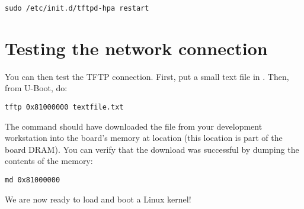 \begin{verbatim}
sudo /etc/init.d/tftpd-hpa restart
\end{verbatim}

\section{Testing the network connection}

You can then test the TFTP connection.  First, put a small text
file in . Then, from U-Boot, do:

\begin{verbatim}
tftp 0x81000000 textfile.txt
\end{verbatim}

The  command should have downloaded the
 file from your development workstation into the
board's memory at location  (this location is part of
the board DRAM). You can verify that the download was successful by
dumping the contents of the memory:

\begin{verbatim}
md 0x81000000
\end{verbatim}

We are now ready to load and boot a Linux kernel!
